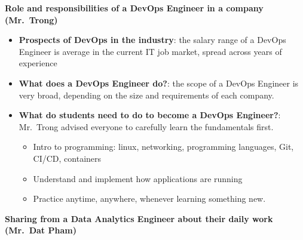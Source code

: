 \vspace{0.5em}\noindent\textbf{Role and responsibilities of a DevOps Engineer in a company
(Mr.~Trong)}\par

\begin{itemize}
\tightlist
\item
  \textbf{Prospects of DevOps in the industry}: the salary range of a
  DevOps Engineer is average in the current IT job market, spread across
  years of experience
\item
  \textbf{What does a DevOps Engineer do?}: the scope of a DevOps
  Engineer is very broad, depending on the size and requirements of each
  company.
\item
  \textbf{What do students need to do to become a DevOps Engineer?}:
  Mr.~Trong advised everyone to carefully learn the fundamentals first.

  \begin{itemize}
  \tightlist
  \item
    Intro to programming: linux, networking, programming languages, Git,
    CI/CD, containers
  \item
    Understand and implement how applications are running
  \item
    Practice anytime, anywhere, whenever learning something new.
  \end{itemize}
\end{itemize}

\vspace{0.5em}\noindent\textbf{Sharing from a Data Analytics Engineer about their daily work
(Mr.~Dat
Pham)}\par

